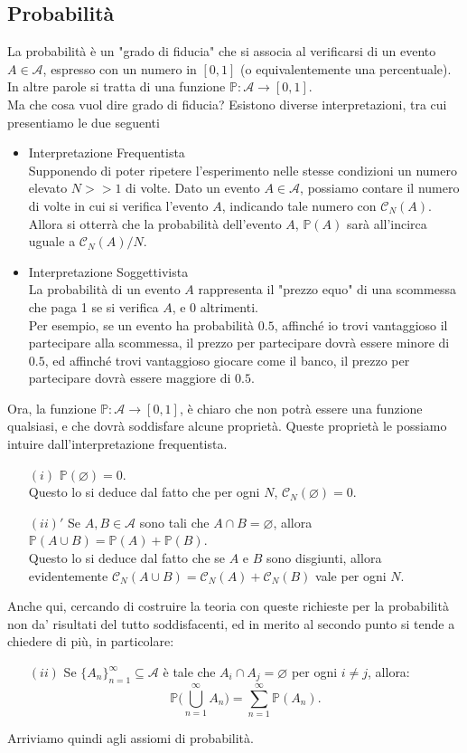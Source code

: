 \documentclass[11pt]{book}
\theoremstyle{Definizione}
\theoremstyle{TeoremaProposizioneLemmaCorollario}
\theoremstyle{OsservazioneNota}
\renewcommand{\P}{\mathbb{P}}
\begin{document}
\subsection{Probabilità}
La probabilità è un "grado di fiducia" che si associa al verificarsi di un evento $A\in \mathcal{A}$, espresso con un numero in $[0,1]$ (o equivalentemente una percentuale).\\
In altre parole si tratta di una funzione $\P:\mathcal{A}\longrightarrow [0,1]$.\\
Ma che cosa vuol dire grado di fiducia? Esistono diverse interpretazioni, tra cui presentiamo le due seguenti
\begin{itemize}
\item Interpretazione Frequentista\\
Supponendo di poter ripetere l'esperimento nelle stesse condizioni un numero elevato $N >> 1$ di volte. Dato un evento $A\in \mathcal{A}$, possiamo contare il numero di volte in cui si verifica l'evento $A$, indicando tale numero con $\mathcal{C}_N(A)$. Allora si otterrà che la probabilità dell'evento $A$, $\P(A)$ sarà all'incirca uguale a $\mathcal{C}_N(A)/N$.
\item Interpretazione Soggettivista\\
La probabilità di un evento $A$ rappresenta il "prezzo equo" di una scommessa che paga 1 se si verifica $A$, e $0$ altrimenti.\\
Per esempio, se un evento ha probabilità $0.5$, affinché io trovi vantaggioso il partecipare alla scommessa, il prezzo per partecipare dovrà essere minore di $0.5$, ed affinché trovi vantaggioso giocare come il banco, il prezzo per partecipare dovrà essere maggiore di $0.5$.
\end{itemize}
Ora, la funzione $\P:\mathcal{A}\longrightarrow [0,1]$, è chiaro che non potrà essere una funzione qualsiasi, e che dovrà soddisfare alcune proprietà. Queste proprietà le possiamo intuire dall'interpretazione frequentista.
\begin{itemize}
\item[$(i)$] $\P(\varnothing) = 0$.\\
Questo lo si deduce dal fatto che per ogni $N$, $\mathcal{C}_N(\varnothing) = 0$.
\item[$(ii)'$] Se $A,B\in \mathcal{A}$ sono tali che $A \cap B = \varnothing$, allora $\P(A\cup B) = \P(A)+\P(B)$.\\
Questo lo si deduce dal fatto che se $A$ e $B$ sono disgiunti, allora evidentemente $\mathcal{C}_N(A\cup B) = \mathcal{C}_N(A)+\mathcal{C}_N(B)$ vale per ogni $N$.
\end{itemize}
Anche qui, cercando di costruire la teoria con queste richieste per la probabilità non da' risultati del tutto soddisfacenti, ed in merito al secondo punto si tende a chiedere di più, in particolare:
\begin{itemize}
\item[$(ii)$] Se $\{A_n\}_{n = 1}^\infty\subseteq \mathcal{A}$ è tale che $A_i \cap A_j = \varnothing$ per ogni $i \neq j$, allora: $$
\P\Bigg(\bigcup_{n = 1}^\infty A_n\Bigg) = \sum_{n = 1}^\infty \P(A_n).
$$
\end{itemize}
Arriviamo quindi agli assiomi di probabilità.
\end{document}
